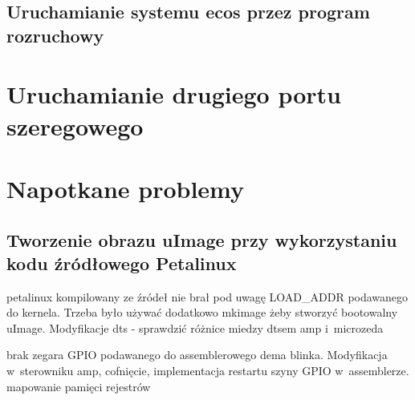   	
  	
  \subsection{Uruchamianie systemu ecos przez program rozruchowy} 
  	\label{ssub:uruchamianie_systemu_przez_program_rozruchowy}
  	
  	
  	
  	
  	
  	
 \section{Uruchamianie drugiego portu szeregowego} 
  \label{sec:uruchamianie_drugiego_portu_szeregowego}
  
  
  
 \section{Napotkane problemy} 
  \label{sec:napotkane_problemy}
  
  \subsection{Tworzenie obrazu uImage przy wykorzystaniu kodu źródłowego Petalinux}
  	\label{ssub:tworzenie_obrazu_uimage_przy_wykorzystaniu_kodu_r_d_owego_petalinux}
  	
  	petalinux kompilowany ze źródeł nie brał pod uwagę LOAD\_ADDR podawanego do kernela. Trzeba było używać dodatkowo mkimage żeby stworzyć bootowalny uImage.
  	Modyfikacje dts - sprawdzić różnice miedzy dtsem amp i~microzeda
  	
  	
  	
  	
  	brak zegara GPIO podawanego do assemblerowego dema blinka. Modyfikacja w~sterowniku amp, cofnięcie, implementacja restartu szyny GPIO w~assemblerze.
  	mapowanie pamięci rejestrów
  	
